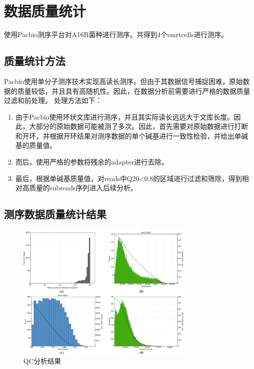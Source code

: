 \section{数据质量统计}
使用Pacbio测序平台对A16R菌种进行测序。共得到4个smrtcells进行测序。
\subsection{质量统计方法}
Pacbio使用单分子测序技术实现高读长测序。但由于其数据信号捕捉困难，原始数据的质量较低，并且具有高随机性。因此，在数据分析前需要进行严格的数据质量过滤和前处理。
处理方法如下：
\begin{enumerate}
  \item 由于Pacbio使用环状文库进行测序，并且其实际读长远远大于文库长度。因此，大部分的原始数据可能被测了多次。因此，首先需要对原始数据进行打断和开环，并根据开环结果对测序数据的单个碱基进行一致性检验，并给出单碱基的质量值。
  \item 而后，使用严格的参数将残余的adapter进行去除。
  \item 最后，根据单碱基质量值，对reads中Q20<0.8的区域进行过滤和筛除，得到相对高质量的subreads序列进入后续分析。




\end{enumerate}



\subsection{测序数据质量统计结果}



\begin{figure}[H]

    \centering
    \includegraphics[width=0.8\textwidth]{qc.png}
    \captionsetup{labelsep=period}
    \caption{QC分析结果}
\end{figure}

